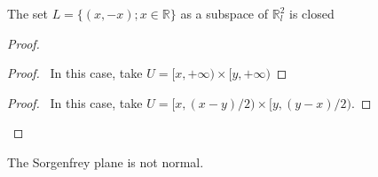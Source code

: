 \begin{lm}
 \label{lm:closed_sorgenfrey}
The set $L = \{ (x,-x) ; x \in \mathbb{R} \}$ as a subspace of
    $\mathbb{R}_l^2$ is closed
\end{lm}

 \begin{proof}
  \begin{proof}
    \pf\ In this case, take $U = [x,+\infty) \times [y, + \infty)$
  \end{proof}
  \begin{proof}
    \pf\ In this case, take $U = [x,(x-y)/2) \times [y,(y-x)/2)$.
  \end{proof}
\end{proof}

\begin{prop}[AC]
The Sorgenfrey plane is not normal.
\end{prop}

